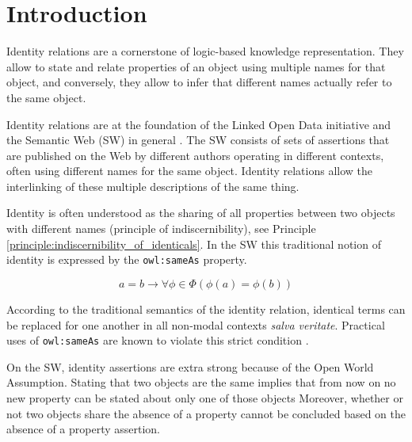 \section{Introduction}
\label{sec:introduction}

Identity relations are a cornerstone of logic-based knowledge representation.
They allow to state and relate properties of an object
  using multiple names for that object, and conversely,
  they allow to infer that different names actually refer to the same object.

Identity relations are
  at the foundation of the Linked Open Data initiative
  and the Semantic Web (SW) in general \cite{BizerCyganiakHeath2007}.
The SW consists of sets of assertions that are published on the Web
  by different authors operating in different contexts,
  often using different names for the same object.
Identity relations allow the interlinking of these multiple descriptions
  of the same thing.

Identity is often understood as the sharing of all properties between
  two objects with different names (principle of indiscernibility),
  see Principle \ref{principle:indiscernibility_of_identicals}.
In the SW this traditional notion of identity is expressed by
  the \texttt{owl:sameAs} property.\cite{MotikPaterschneiderGrau2012}

\begin{principle}
\label{principle:indiscernibility_of_identicals}
\begin{equation}
    a = b
  \rightarrow
    \forall \phi \in \Phi (\phi(a) = \phi(b)\nonumber)
\end{equation}
\end{principle}

\noindent According to the traditional semantics of the identity relation,
  identical terms can be replaced for one another in all non-modal contexts
  \emph{salva veritate}.
Practical uses of \texttt{owl:sameAs} are known to violate this
  strict condition
  \cite{HalpinHayes2010,HalpinHayesMccuskerMcguinnessThompson2010}.

On the SW,
  identity assertions are extra strong because of the Open World Assumption.
Stating that two objects are the same
  implies that from now on no new property can be stated about
  only one of those objects
Moreover, whether or not two objects share the absence of a property
  cannot be concluded based on the absence of a property assertion.

